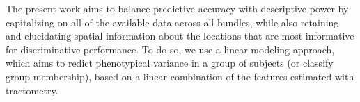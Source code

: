 \documentclass[10pt,letterpaper]{article}
\begin{document}


The present work aims to balance predictive accuracy with descriptive power
\cite{Murdoch2019-ax, Breiman2001-uz} by capitalizing on all of the available
data across all bundles, while also retaining and elucidating spatial
information about the locations that are most informative for discriminative
performance. To do so, we use a linear modeling approach, which aims to
redict phenotypical variance in a group of subjects (or classify group
membership), based on a linear combination of the features estimated with
tractometry.

\end{document}
